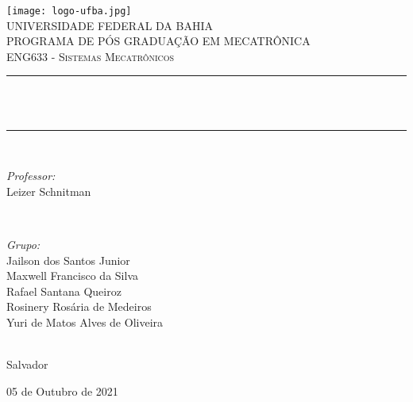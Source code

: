 \begin{titlepage}
	\centering
	\texttt{[image: logo-ufba.jpg]}\\[0.5 cm]	%
	\textsc{\LARGE UNIVERSIDADE FEDERAL DA BAHIA}\\[0.5 cm]	%
	\textsc{\large PROGRAMA DE PÓS GRADUAÇÃO EM MECATRÔNICA}\\[1 cm]
	\textsc{\Large ENG633 - Sistemas Mecatrônicos}\\[0.5 cm]				%
	\rule{\linewidth}{0.2 mm} \\
	{ \huge \bfseries \thetitle}\\
	\rule{\linewidth}{0.2 mm} \\[1 cm]
	
	\begin{minipage}{0.5\textwidth}
		\begin{flushleft} \large
			\emph{Professor:}\\
			Leizer Schnitman\\
		\end{flushleft}
	\end{minipage}~
	\begin{minipage}{0.5\textwidth}
		
		\begin{flushright} \large
			\emph{Grupo:} \\
			Jailson dos Santos Junior\\
			Maxwell Francisco da Silva\\
			Rafael Santana Queiroz\\
			Rosinery Rosária de Medeiros\\
			Yuri de Matos Alves de Oliveira
		\end{flushright}
		
	\end{minipage}\\[1.0 cm]
	
	
	Salvador
	
	05 de Outubro de 2021
	
	
	
	
\end{titlepage}